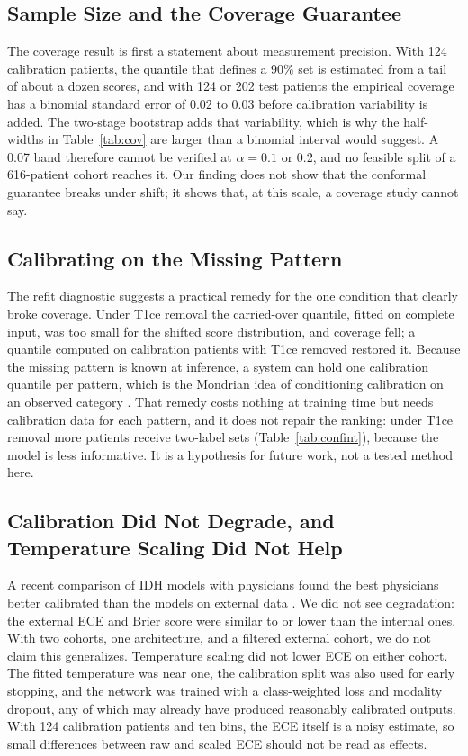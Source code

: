 \documentclass[journal]{IEEEtran}
\begin{document}
\subsection{Sample Size and the Coverage Guarantee}
The coverage result is first a statement about measurement precision. With 124 calibration patients, the quantile that defines a 90\% set is estimated from a tail of about a dozen scores, and with 124 or 202 test patients the empirical coverage has a binomial standard error of 0.02 to 0.03 before calibration variability is added. The two-stage bootstrap adds that variability, which is why the half-widths in Table~\ref{tab:cov} are larger than a binomial interval would suggest. A 0.07 band therefore cannot be verified at $\alpha=0.1$ or 0.2, and no feasible split of a 616-patient cohort reaches it. Our finding does not show that the conformal guarantee breaks under shift; it shows that, at this scale, a coverage study cannot say.

\subsection{Calibrating on the Missing Pattern}
The refit diagnostic suggests a practical remedy for the one condition that clearly broke coverage. Under T1ce removal the carried-over quantile, fitted on complete input, was too small for the shifted score distribution, and coverage fell; a quantile computed on calibration patients with T1ce removed restored it. Because the missing pattern is known at inference, a system can hold one calibration quantile per pattern, which is the Mondrian idea of conditioning calibration on an observed category \cite{vovk2005}. That remedy costs nothing at training time but needs calibration data for each pattern, and it does not repair the ranking: under T1ce removal more patients receive two-label sets (Table~\ref{tab:confint}), because the model is less informative. It is a hypothesis for future work, not a tested method here.

\subsection{Calibration Did Not Degrade, and Temperature Scaling Did Not Help}
A recent comparison of IDH models with physicians found the best physicians better calibrated than the models on external data \cite{takahashi2026}. We did not see degradation: the external ECE and Brier score were similar to or lower than the internal ones. With two cohorts, one architecture, and a filtered external cohort, we do not claim this generalizes. Temperature scaling did not lower ECE on either cohort. The fitted temperature was near one, the calibration split was also used for early stopping, and the network was trained with a class-weighted loss and modality dropout, any of which may already have produced reasonably calibrated outputs. With 124 calibration patients and ten bins, the ECE itself is a noisy estimate, so small differences between raw and scaled ECE should not be read as effects.
\end{document}
